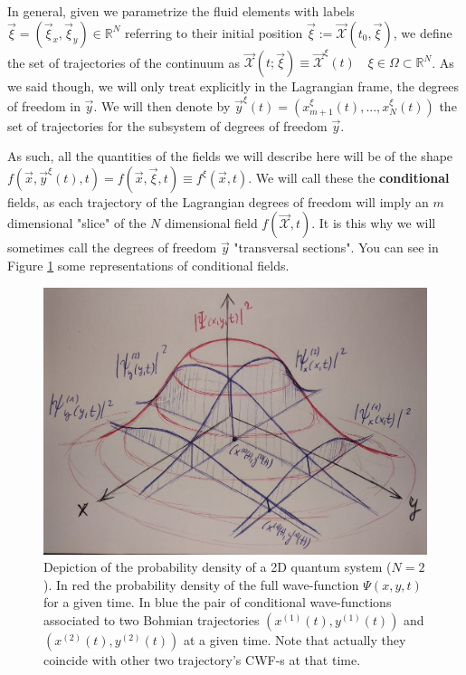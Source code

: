 \documentclass[11pt, a4paper]{article} %
\newcommand{\R}{\mathbb{R}} %
\newcommand{\x}{\mathcal{X}}
\begin{document}
In general, given we parametrize the fluid elements with labels $\vec{\xi}=(\vec{\xi}_x,\vec{\xi}_y)\in\R^N$ referring to their initial position $\vec{\xi}:=\vec{\x}(t_0, \vec{\xi})$, we define the set of trajectories of the continuum as $\vec{\x}(t;\vec{\xi}) \equiv \vec{\x}^\xi(t) \quad \xi \in \Omega \subset \R^N$. As we said though, we will only treat explicitly in the Lagrangian frame, the degrees of freedom in $\vec{y}$. We will then denote by $\vec{y}^\xi(t)=(x_{m+1}^\xi(t),...,x_N^\xi(t))$ the set of trajectories for the subsystem of degrees of freedom $\vec{y}$.

As such, all the quantities of the fields we will describe here will be of the shape $f(\vec{x}, \vec{y}^\xi(t),t)=f(\vec{x}, \vec{\xi},t)\equiv f^\xi(\vec{x},t)$. We will call these the {\bf conditional} fields, as each trajectory of the Lagrangian degrees of freedom will imply an $m$ dimensional "slice" of the $N$ dimensional field $f(\vec{\x},t)$. It is this why we will sometimes call the degrees of freedom $\vec{y}$ "transversal sections". You can see in Figure \ref{fig:slices} some representations of conditional fields.

\begin{figure}[h!]
  \centering
    \includegraphics[width=0.65\linewidth]{slices.jpg}
  \caption{Depiction of the probability density of a 2D quantum system ($N=2$). In red the probability density of the full wave-function $\Psi(x,y,t)$ for a given time. In blue the pair of conditional wave-functions associated to two Bohmian trajectories $(x^{(1)}(t),y^{(1)}(t))$ and $(x^{(2)}(t),y^{(2)}(t))$ at a given time. Note that actually they coincide with other two trajectory's CWF-s at that time. }
  \label{fig:slices}
\end{figure}
\end{document}
